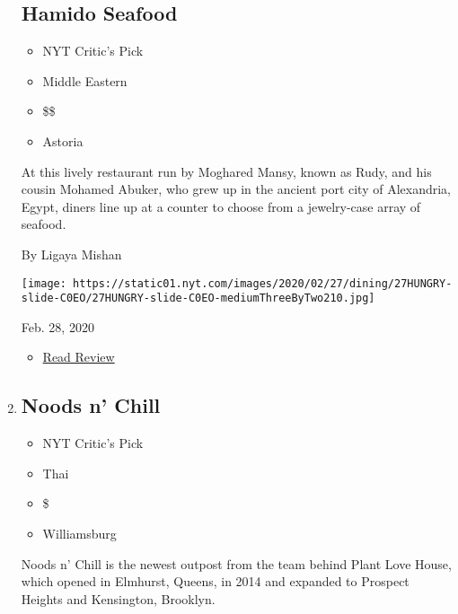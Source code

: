 \begin{enumerate}
  \hypertarget{hamido-seafood}{%
  \subsection{Hamido Seafood}\label{hamido-seafood}}

  \begin{itemize}
  \tightlist
  \item
    NYT Critic's Pick
  \item
    Middle Eastern
  \item
    \$\$
  \item
    Astoria
  \end{itemize}

  At this lively restaurant run by Moghared Mansy, known as Rudy, and
  his cousin Mohamed Abuker, who grew up in the ancient port city of
  Alexandria, Egypt, diners line up at a counter to choose from a
  jewelry-case array of seafood.

  By Ligaya Mishan

  \texttt{[image: https://static01.nyt.com/images/2020/02/27/dining/27HUNGRY-slide-C0EO/27HUNGRY-slide-C0EO-mediumThreeByTwo210.jpg]}

  Feb. 28, 2020

  \begin{itemize}
  \tightlist
  \item
    \href{https://www.nytimes.com/2020/02/28/dining/hamido-seafood-astoria.html?rref=collection\%2Fcollection\%2Frestaurant-guide}{Read
    Review}
  \end{itemize}
\item
  \href{https://www.nytimes.com/2020/02/20/dining/noods-n-chill-review-thai.html}{}

  \hypertarget{noods-n-chill}{%
  \subsection{Noods n' Chill}\label{noods-n-chill}}

  \begin{itemize}
  \tightlist
  \item
    NYT Critic's Pick
  \item
    Thai
  \item
    \$
  \item
    Williamsburg
  \end{itemize}

  Noods n' Chill is the newest outpost from the team behind Plant Love
  House, which opened in Elmhurst, Queens, in 2014 and expanded to
  Prospect Heights and Kensington, Brooklyn.


\end{enumerate}
